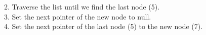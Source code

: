 \documentclass[preview]{standalone}
\begin{document}
2. Traverse the list until we find the last node (5).\\3. Set the next pointer of the new node to null.\\4. Set the next pointer of the last node (5) to the new node (7).\\
\end{document}

